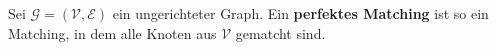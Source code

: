 \begin{definition}\label{def:perfect-matching}
Sei $\mathcal{G} = (\mathcal{V}, \mathcal{E})$ ein ungerichteter Graph. Ein \textbf{perfektes Matching} 
 ist so ein Matching, in dem alle Knoten aus $\mathcal{V}$ gematcht sind.\textnormal{\cite[S.~735, Übung]{cormen:matchings}}
\end{definition}
